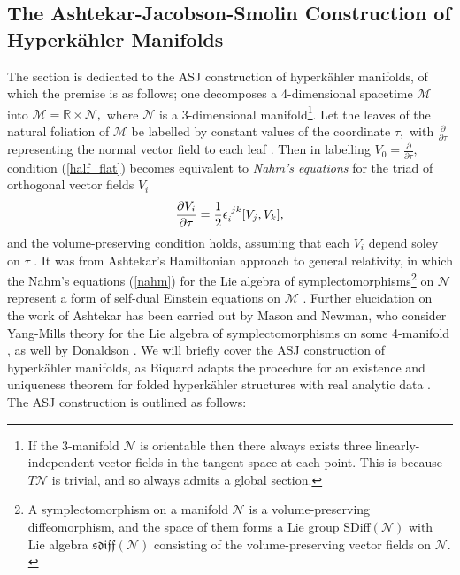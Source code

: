 \documentclass[a4paper,12pt, onecolumn, notitlepage]{article}
\theoremstyle{definition}
\theoremstyle{remark}
\newcommand{\e}{\epsilon}
\newcommand{\ddt}[1]{\frac{\partial #1}{\partial \tau}}
\newcommand{\dd}[2]{\frac{\partial #1}{\partial #2}}
\newcommand{\HK}{hyperk\"ahler }
\newcommand{\R}{\mathbb{R}}
\begin{document}
\subsection{The Ashtekar-Jacobson-Smolin Construction of Hyperk\"ahler Manifolds}
The section is dedicated to the ASJ construction of \HK manifolds, of which the premise is as follows; one decomposes a 4-dimensional spacetime $\mathcal{M}$ into $\mathcal{M}=\R\times \mathcal{N},$ where $\mathcal{N}$ is a 3-dimensional manifold\footnote{If the 3-manifold $\mathcal{N}$ is orientable then there always exists three linearly-independent vector fields in the tangent space at each point. This is because $T\mathcal{N}$ is trivial, and so always admits a global section.}. Let the leaves of the natural foliation of $\mathcal{M}$ be labelled by constant values of the coordinate $\tau,$ with $\ddt{}$ representing the normal vector field to each leaf \cite{donaldson}. Then in labelling $V_{0}=\ddt{},$ condition (\ref{half_flat}) becomes equivalent to \emph{Nahm's equations} for the triad of orthogonal vector fields $V_{i}$
\begin{equation}
\label{nahm}
\dd{V_{i}}{\tau} = \frac{1}{2}\e\indices{_i^j^k}[V_{j},V_{k}],
\end{equation}
and the volume-preserving condition holds, assuming that each $V_{i}$ depend soley on $\tau$ \cite{donaldson}. It was from Ashtekar's Hamiltonian approach to general relativity, in which the Nahm's equations (\ref{nahm}) for the Lie algebra of symplectomorphisms\footnote{A symplectomorphism on a manifold $\mathcal{N}$ is a  volume-preserving diffeomorphism, and the space of them forms a Lie group  SDiff$(\mathcal{N})$ with Lie algebra $\mathfrak{sdiff}(\mathcal{N})$ consisting of the volume-preserving vector fields on $\mathcal{N}.$} on $\mathcal{N}$ represent a form of self-dual Einstein equations on $\mathcal{M}$ \cite{ashtekar_1987}. Further elucidation on the work of Ashtekar has been carried out by Mason and Newman, who consider Yang-Mills theory for the Lie algebra of symplectomorphisms on some 4-manifold \cite{mason_1989}, as well by Donaldson \cite{donaldson}. We will briefly cover the ASJ construction of \HK manifolds, as Biquard adapts the procedure for an existence and uniqueness theorem for folded \HK structures with real analytic data \cite{biquard_2015}.\\
The ASJ construction is outlined as follows:\\
\end{document}
